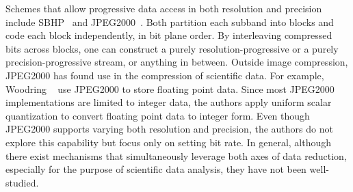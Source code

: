 Schemes that allow progressive data access in both resolution and precision include
SBHP~\cite{sbhp2000} and JPEG2000~\cite{jpeg2000}. Both partition each subband into blocks and code
each block independently, in bit plane order. By interleaving compressed bits across blocks, one can
construct a purely resolution-progressive or a purely precision-progressive stream, or anything in
between. Outside image compression, JPEG2000 has found use in the compression of scientific data. For
example, Woodring \etal~\cite{woodring2011} use JPEG2000 to store floating point data. Since most
JPEG2000 implementations are limited to integer data, the authors apply uniform scalar quantization
to convert floating point data to integer form. Even though JPEG2000 supports varying both
resolution and precision, the authors do not explore this capability but focus only on setting bit
rate. In general, although there exist mechanisms that simultaneously leverage both axes of data
reduction, especially for the purpose of scientific data analysis, they have not been
well-studied.

